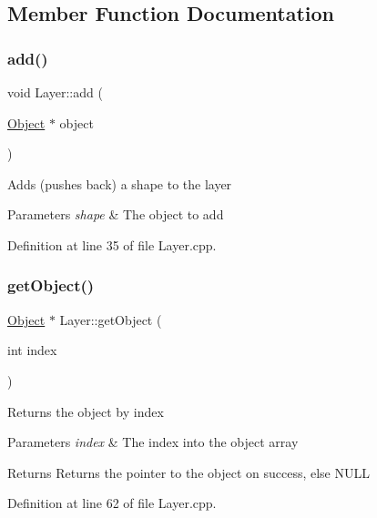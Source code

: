 \subsection{Member Function Documentation}
\mbox{\label{class_layer_aa1e828db7d673a1083aa2eb211663628}} 
\subsubsection{\texorpdfstring{add()}{add()}}
{\footnotesize\ttfamily void Layer\+::add (\begin{DoxyParamCaption}\item[{\hyperlink{class_object}{Object} $\ast$}]{object }\end{DoxyParamCaption})}

Adds (pushes back) a shape to the layer 
\begin{DoxyParams}{Parameters}
{\em shape} & The object to add \\
\hline
\end{DoxyParams}


Definition at line 35 of file Layer.\+cpp.

\mbox{\label{class_layer_ae51468bd68ee2ba01571efc430ac666f}} 
\subsubsection{\texorpdfstring{get\+Object()}{getObject()}}
{\footnotesize\ttfamily \hyperlink{class_object}{Object} $\ast$ Layer\+::get\+Object (\begin{DoxyParamCaption}\item[{int}]{index }\end{DoxyParamCaption})}

Returns the object by index 
\begin{DoxyParams}{Parameters}
{\em index} & The index into the object array \\
\hline
\end{DoxyParams}
\begin{DoxyReturn}{Returns}
Returns the pointer to the object on success, else N\+U\+LL 
\end{DoxyReturn}


Definition at line 62 of file Layer.\+cpp.

\mbox{\label{class_layer_ac22c1bfa8ac715224adcf27409019e9f}} 

